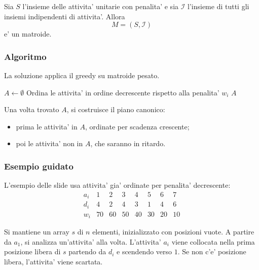 \begin{teorema}
Sia $S$ l'insieme delle attivita' unitarie con penalita' e sia $\mathcal{I}$ l'insieme di tutti gli insiemi indipendenti di attivita'. Allora
\[
M=(S,\mathcal{I})
\]
e' un matroide.
\end{teorema}

\subsubsection{Algoritmo}
La soluzione applica il greedy su matroide pesato.

\begin{algorithm}[H]
	\caption{\textsc{UnitTaskGreedy}$(S,D,W)$}
	$A\gets\emptyset$\;
	Ordina le attivita' in ordine decrescente rispetto alla penalita' $w_i$\;
	\Return $A$\;
\end{algorithm}

Una volta trovato $A$, si costruisce il piano canonico:
\begin{itemize}
	\item prima le attivita' in $A$, ordinate per scadenza crescente;
	\item poi le attivita' non in $A$, che saranno in ritardo.
\end{itemize}

\subsubsection{Esempio guidato}
L'esempio delle slide usa attivita' gia' ordinate per penalita' decrescente:
\[
\begin{array}{c|ccccccc}
a_i & 1 & 2 & 3 & 4 & 5 & 6 & 7 \\
\hline
d_i & 4 & 2 & 4 & 3 & 1 & 4 & 6 \\
w_i & 70 & 60 & 50 & 40 & 30 & 20 & 10
\end{array}
\]

Si mantiene un array $s$ di $n$ elementi, inizializzato con posizioni vuote. A partire da $a_1$, si analizza un'attivita' alla volta. L'attivita' $a_i$ viene collocata nella prima posizione libera di $s$ partendo da $d_i$ e scendendo verso $1$. Se non c'e' posizione libera, l'attivita' viene scartata.

